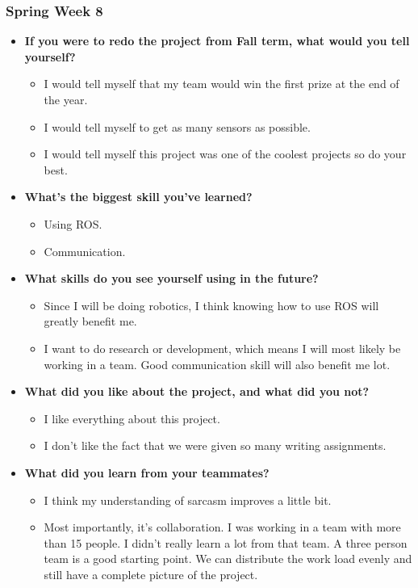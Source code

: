 \documentclass{article}
\begin{document}
\subsubsection{Spring Week 8}
\begin{itemize}
    \item {\textbf{If you were to redo the project from Fall term, what would you tell yourself?}}
    \begin{itemize}
      \item I would tell myself that my team would win the first prize at the end of the year.
      \item I would tell myself to get as many sensors as possible.
      \item I would tell myself this project was one of the coolest projects so do your best.
    \end{itemize}

    \item {\textbf{What's the biggest skill you've learned?}}
    \begin{itemize}
      \item Using ROS.
      \item Communication.
    \end{itemize}

    \item{\textbf{What skills do you see yourself using in the future?}}
    \begin{itemize}
      \item Since I will be doing robotics, I think knowing how to use ROS will greatly benefit me.
      \item I want to do research or development, which means I will most likely be working in a
      team. Good communication skill will also benefit me lot.
    \end{itemize}

    \item{\textbf{What did you like about the project, and what did you not?}}
    \begin{itemize}
      \item I like everything about this project.
      \item I don't like the fact that we were given so many writing assignments.
    \end{itemize}

    \item{\textbf{What did you learn from your teammates?}}
    \begin{itemize}
      \item I think my understanding of sarcasm improves a little bit.
      \item Most importantly, it's collaboration. I was working in a team with more
      than 15 people. I didn't really learn a lot from that team. A three person team
      is a good starting point. We can distribute the work load evenly and still have
      a complete picture of the project.
    \end{itemize}


\end{itemize}
\end{document}
